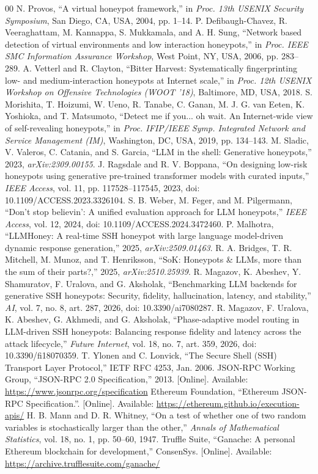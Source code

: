 \documentclass[conference]{IEEEtran}
\begin{document}
\begin{thebibliography}{00}
 N. Provos, ``A virtual honeypot framework,'' in \emph{Proc. 13th USENIX Security Symposium}, San Diego, CA, USA, 2004, pp. 1--14.
 P. Defibaugh-Chavez, R. Veeraghattam, M. Kannappa, S. Mukkamala, and A. H. Sung, ``Network based detection of virtual environments and low interaction honeypots,'' in \emph{Proc. IEEE SMC Information Assurance Workshop}, West Point, NY, USA, 2006, pp. 283--289.
 A. Vetterl and R. Clayton, ``Bitter Harvest: Systematically fingerprinting low- and medium-interaction honeypots at Internet scale,'' in \emph{Proc. 12th USENIX Workshop on Offensive Technologies (WOOT '18)}, Baltimore, MD, USA, 2018.
 S. Morishita, T. Hoizumi, W. Ueno, R. Tanabe, C. Ganan, M. J. G. van Eeten, K. Yoshioka, and T. Matsumoto, ``Detect me if you... oh wait. An Internet-wide view of self-revealing honeypots,'' in \emph{Proc. IFIP/IEEE Symp. Integrated Network and Service Management (IM)}, Washington, DC, USA, 2019, pp. 134--143.
 M. Sladic, V. Valeros, C. Catania, and S. Garcia, ``LLM in the shell: Generative honeypots,'' 2023, \emph{arXiv:2309.00155}.
 J. Ragsdale and R. V. Boppana, ``On designing low-risk honeypots using generative pre-trained transformer models with curated inputs,'' \emph{IEEE Access}, vol. 11, pp. 117528--117545, 2023, doi: 10.1109/ACCESS.2023.3326104.
 S. B. Weber, M. Feger, and M. Pilgermann, ``Don't stop believin': A unified evaluation approach for LLM honeypots,'' \emph{IEEE Access}, vol. 12, 2024, doi: 10.1109/ACCESS.2024.3472460.
 P. Malhotra, ``LLMHoney: A real-time SSH honeypot with large language model-driven dynamic response generation,'' 2025, \emph{arXiv:2509.01463}.
 R. A. Bridges, T. R. Mitchell, M. Munoz, and T. Henriksson, ``SoK: Honeypots \& LLMs, more than the sum of their parts?,'' 2025, \emph{arXiv:2510.25939}.
 R. Magazov, K. Abeshev, Y. Shamuratov, F. Uralova, and G. Aksholak, ``Benchmarking LLM backends for generative SSH honeypots: Security, fidelity, hallucination, latency, and stability,'' \emph{AI}, vol. 7, no. 8, art. 287, 2026, doi: 10.3390/ai7080287.
 R. Magazov, F. Uralova, K. Abeshev, G. Akhmedi, and G. Aksholak, ``Phase-adaptive model routing in LLM-driven SSH honeypots: Balancing response fidelity and latency across the attack lifecycle,'' \emph{Future Internet}, vol. 18, no. 7, art. 359, 2026, doi: 10.3390/fi18070359.
 T. Ylonen and C. Lonvick, ``The Secure Shell (SSH) Transport Layer Protocol,'' IETF RFC 4253, Jan. 2006.
 JSON-RPC Working Group, ``JSON-RPC 2.0 Specification,'' 2013. [Online]. Available: \url{https://www.jsonrpc.org/specification}
 Ethereum Foundation, ``Ethereum JSON-RPC Specification.''. [Online]. Available: \url{https://ethereum.github.io/execution-apis/}
 H. B. Mann and D. R. Whitney, ``On a test of whether one of two random variables is stochastically larger than the other,'' \emph{Annals of Mathematical Statistics}, vol. 18, no. 1, pp. 50--60, 1947.
 Truffle Suite, ``Ganache: A personal Ethereum blockchain for development,'' ConsenSys. [Online]. Available: \url{https://archive.trufflesuite.com/ganache/}
\end{thebibliography}
\end{document}
